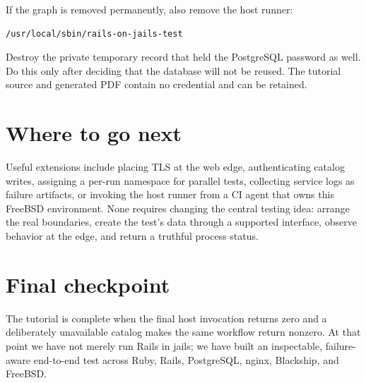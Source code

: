 If the graph is removed permanently, also remove the host runner:

\begin{lstlisting}
/usr/local/sbin/rails-on-jails-test
\end{lstlisting}

Destroy the private temporary record that held the PostgreSQL password as
well. Do this only after deciding that the database will not be reused. The
tutorial source and generated PDF contain no credential and can be retained.

\section{Where to go next}

Useful extensions include placing TLS at the web edge, authenticating catalog
writes, assigning a per-run namespace for parallel tests, collecting service
logs as failure artifacts, or invoking the host runner from a CI agent that
owns this FreeBSD environment. None requires changing the central testing
idea: arrange the real boundaries, create the test's data through a supported
interface, observe behavior at the edge, and return a truthful process status.

\section{Final checkpoint}

The tutorial is complete when the final host invocation returns zero and a
deliberately unavailable catalog makes the same workflow return nonzero. At
that point we have not merely run Rails in jails; we have built an inspectable,
failure-aware end-to-end test across Ruby, Rails, PostgreSQL, nginx, Blackship,
and FreeBSD.
